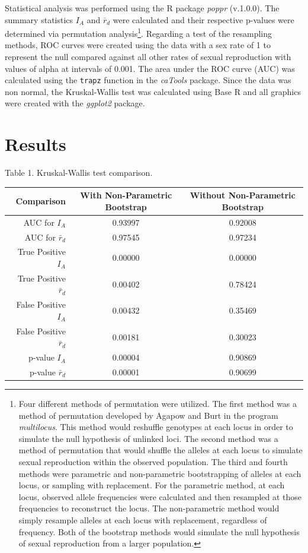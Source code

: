 \documentclass[letterpaper, 10pt]{article}
\newcommand{\tab}{\hspace*{1.5em}}
\begin{document}
Statistical analysis was performed using the R package \textit{poppr} (v.1.0.0). 
The summary statistics $I_A$ and $\bar{r}_d$ were calculated and their respective p-values were determined via permutation analysis\footnote{
Four different methods of permutation were utilized.
The first method was a method of permutation developed by Agapow and Burt in the program \textit{multilocus}.
This method would reshuffle genotypes at each locus in order to simulate the null hypothesis of unlinked loci. 
The second method was a method of permutation that would shuffle the alleles at each locus to simulate sexual reproduction within the observed population.
The third and fourth methods were parametric and non-parametric bootstrapping of alleles at each locus, or sampling with replacement. 
For the parametric method, at each locus, observed allele frequencies were calculated and then resampled at those frequencies to reconstruct the locus. 
The non-parametric method would simply resample alleles at each locus with replacement, regardless of frequency.
Both of the bootstrap methods would simulate the null hypothesis of sexual reproduction from a larger population.}. Regarding a test of the resampling methods, ROC curves were created using the data with a sex rate of 1 to represent the null compared against all other rates of sexual reproduction with values of alpha at intervals of 0.001. The area under the ROC curve (AUC) was calculated using the \texttt{trapz} function in the \textit{caTools} package. Since the data was non normal, the Kruskal-Wallis test was calculated using Base R and all graphics were created with the \textit{ggplot2} package.

\section{Results}
\tab 
Table 1. Kruskal-Wallis test comparison.
\begin{table}[ht]
\centering
\begin{tabular}{rcc}
  \hline
Comparison & With Non-Parametric Bootstrap & Without Non-Parametric Bootstrap \\ 
  \hline
AUC for $I_A$ & 0.93997 & 0.92008 \\ 
  AUC for $\bar{r}_d$ & 0.97545 & 0.97234 \\
  \hline
  True Positive $I_A$ & 0.00000 & 0.00000 \\ 
  True Positive $\bar{r}_d$ & 0.00402 & 0.78424 \\
  \hline  
  False Positive $I_A$ & 0.00432 & 0.35469 \\ 
  False Positive $\bar{r}_d$ & 0.00181 & 0.30023 \\  
  \hline
  p-value $I_A$ & 0.00004 & 0.90869 \\ 
  p-value $\bar{r}_d$ & 0.00001 & 0.90699 \\ 
   \hline
\end{tabular}
\end{table}
\end{document}
